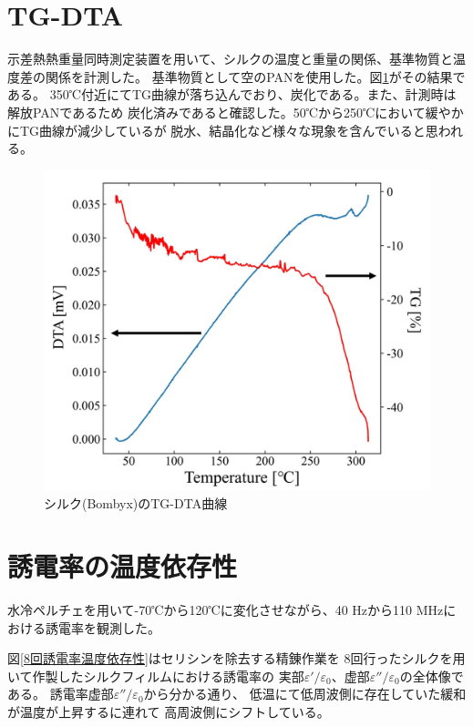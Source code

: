 \documentclass[dvipdfmx,12pt,a4paper]{jreport}
\begin{document}
		\section{TG-DTA}
		示差熱熱重量同時測定装置を用いて、シルクの温度と重量の関係、基準物質と温度差の関係を計測した。
		基準物質として空のPANを使用した。図\ref{TG_DTA}がその結果である。
		350℃付近にてTG曲線が落ち込んでおり、炭化である。また、計測時は解放PANであるため
		炭化済みであると確認した。50℃から250℃において緩やかにTG曲線が減少しているが
		脱水、結晶化など様々な現象を含んでいると思われる。
		\begin{figure}[H]
			\centering
			\includegraphics[scale=0.4]{TG_DTA.jpg}
			\caption{シルク(Bombyx)のTG-DTA曲線}
			\label{TG_DTA}
		\end{figure}
			\section{誘電率の温度依存性}
			水冷ペルチェを用いて-70℃から120℃に変化させながら、40 Hzから110 MHzにおける誘電率を観測した。
			
			図\ref{8回誘電率温度依存性}はセリシンを除去する精錬作業を
			8回行ったシルクを用いて作製したシルクフィルムにおける誘電率の
			実部$\varepsilon'/\varepsilon_0$、虚部$\varepsilon''/\varepsilon_0$の全体像である。
			誘電率虚部$\varepsilon''/\varepsilon_0$から分かる通り、
			低温にて低周波側に存在していた緩和が温度が上昇するに連れて
			高周波側にシフトしている。
\end{document}
